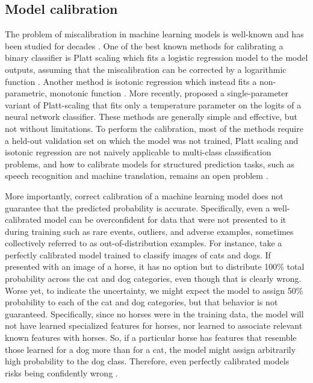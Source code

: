 \subsection{Model calibration} \label{subsec:model-calibration}
% 
The problem of miscalibration in machine learning models is well-known and has been studied for decades \parencite{lewis_sequential_1995, platt_probabilistic_1999, garczarek_classification_2002, zadrozny_transforming_2002, bennett_using_2003, niculescu-mizil_predicting_2005}. One of the best known methods for calibrating a binary classifier is Platt scaling which fits a logistic regression model to the model outputs, assuming that the miscalibration can be corrected by a logarithmic function \parencite{platt_probabilistic_1999}. Another method is isotonic regression which instead fits a non-parametric, monotonic function \parencite{zadrozny_transforming_2002}. 
More recently, \textcite{guo_calibration_2017} proposed a single-parameter variant of Platt-scaling that fits only a temperature parameter on the logits of a neural network classifier. 
These methods are generally simple and effective, but not without limitations. 
To perform the calibration, most of the methods require a held-out validation set on which the model was not trained, Platt scaling and isotonic regression are not naively applicable to multi-class classification problems, and how to calibrate models for structured prediction tasks, such as speech recognition and machine translation, remains an open problem \parencite{astudillo_uncertainty_2010, astudillo_integration_2013, jayashankar_detecting_2020}.

More importantly, correct calibration of a machine learning model does not guarantee that the predicted probability is accurate. 
Specifically, even a well-calibrated model can be overconfident for data that were not presented to it during training such as rare events, outliers, and adverse examples, sometimes collectively referred to as out-of-distribution examples. 
For instance, take a perfectly calibrated model trained to classify images of cats and dogs. If presented with an image of a horse, it has no option but to distribute 100\% total probability across the cat and dog categories, even though that is clearly wrong. 
Worse yet, to indicate the uncertainty, we might expect the model to assign 50\% probability to each of the cat and dog categories, but that behavior is not guaranteed. 
Specifically, since no horses were in the training data, the model will not have learned specialized features for horses, nor learned to associate relevant known features with horses. So, if a particular horse has features that resemble those learned for a dog more than for a cat, the model might assign arbitrarily high probability to the dog class. Therefore, even perfectly calibrated models risks being confidently wrong \parencite{zhou_survey_2022}. 


